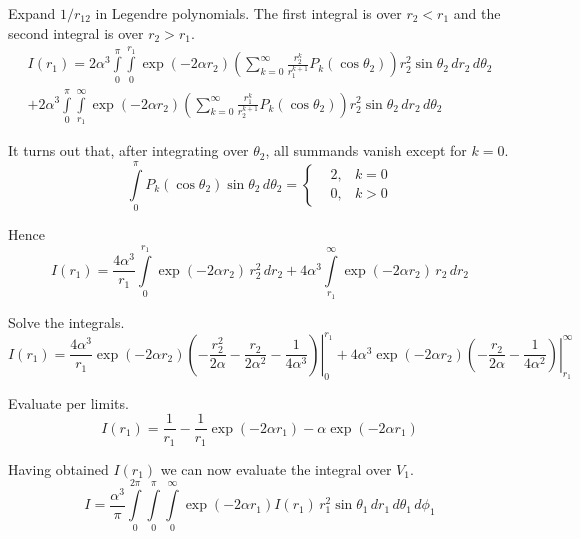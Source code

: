 \documentclass[12pt]{article}
\begin{document}
\noindent
Expand $1/r_{12}$ in Legendre polynomials.
The first integral is over $r_2<r_1$ and the second integral is over $r_2>r_1$.
\begin{multline*}
I(r_1)=
2\alpha^3\int\limits_0^\pi\int\limits_0^{r_1}
\exp(-2\alpha r_2)
\left(\sum_{k=0}^\infty\frac{r_2^k}{r_1^{k+1}}P_k(\cos\theta_2)\right)
r_2^2\sin\theta_2\,dr_2\,d\theta_2
\\
+2\alpha^3\int\limits_0^\pi\int\limits_{r_1}^\infty
\exp(-2\alpha r_2)
\left(\sum_{k=0}^\infty\frac{r_1^k}{r_2^{k+1}}P_k(\cos\theta_2)\right)
r_2^2\sin\theta_2\,dr_2\,d\theta_2
\end{multline*}

\noindent
It turns out that, after integrating over $\theta_2$, all summands vanish except for $k=0$.
\begin{equation*}
\int\limits_0^\pi P_k(\cos\theta_2)\sin\theta_2\,d\theta_2=
\left\{
\begin{aligned}
&2, & k=0
\\
&0, & k>0
\end{aligned}\right.
\tag{5}
\end{equation*}

\noindent
Hence
\begin{equation*}
I(r_1)=
\frac{4\alpha^3}{r_1}\int\limits_0^{r_1}\exp(-2\alpha r_2)\,r_2^2\,dr_2
+4\alpha^3\int\limits_{r_1}^\infty\exp(-2\alpha r_2)\,r_2\,dr_2
\end{equation*}

\noindent
Solve the integrals.
\begin{equation*}
I(r_1)=
\frac{4\alpha^3}{r_1}
\left.
\exp(-2\alpha r_2)\left(-\frac{r_2^2}{2\alpha}-\frac{r_2}{2\alpha^2}-\frac{1}{4\alpha^3}
\right)\right|_0^{r_1}
+4\alpha^3\left.\exp(-2\alpha r_2)\left(-\frac{r_2}{2\alpha}-\frac{1}{4\alpha^2}\right)\right|_{r_1}^\infty
\end{equation*}

\noindent
Evaluate per limits.
\begin{equation*}
I(r_1)=\frac{1}{r_1}-\frac{1}{r_1}\exp(-2\alpha r_1)-\alpha\exp(-2\alpha r_1)
\tag{6}
\end{equation*}

\noindent
Having obtained $I(r_1)$ we can now evaluate the integral over $V_1$.
\begin{equation*}
I=\frac{\alpha^3}{\pi}\int\limits_0^{2\pi}\int\limits_0^\pi\int\limits_0^\infty
\exp(-2\alpha r_1)I(r_1)\,r_1^2\sin\theta_1\,dr_1\,d\theta_1\,d\phi_1
\end{equation*}
\end{document}
